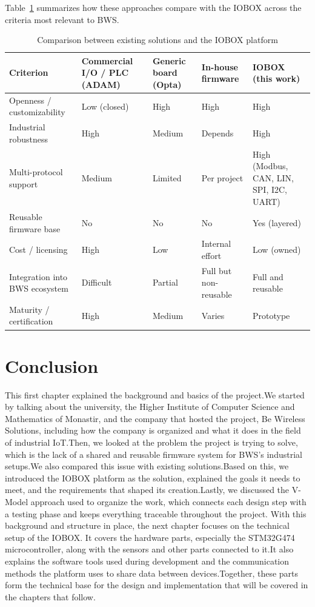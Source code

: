 Table~\ref{tab:comparison} summarizes how these approaches compare with the IOBOX
across the criteria most relevant to BWS.

\begin{table}[H]
\centering
\renewcommand{\arraystretch}{1.4}
\caption{Comparison between existing solutions and the IOBOX platform}
\label{tab:comparison}
\begin{tabular}{|p{3.2cm}|p{2.6cm}|p{2.6cm}|p{2.6cm}|p{2.6cm}|}
\hline
\textbf{Criterion} & \textbf{Commercial I/O / PLC (ADAM)} & \textbf{Generic board (Opta)} & \textbf{In-house firmware} & \textbf{IOBOX (this work)} \\
\hline
Openness / customizability & Low (closed) & High & High & High \\
\hline
Industrial robustness & High & Medium & Depends & High \\
\hline
Multi-protocol support & Medium & Limited & Per project & High (Modbus, CAN, LIN, SPI, I2C, UART) \\
\hline
Reusable firmware base & No & No & No & Yes (layered) \\
\hline
Cost / licensing & High & Low & Internal effort & Low (owned) \\
\hline
Integration into BWS ecosystem & Difficult & Partial & Full but non-reusable & Full and reusable \\
\hline
Maturity / certification & High & Medium & Varies & Prototype \\
\hline
\end{tabular}
\end{table}


\section{Conclusion}

This first chapter explained the background and basics of the project.We started by talking about the university, the Higher Institute of Computer Science and Mathematics of Monastir, and the company that hosted the project, Be Wireless Solutions, including how the company is organized and what it does in the field of industrial IoT.Then, we looked at the problem the project is trying to solve, which is the lack of a shared and reusable firmware system for BWS's industrial setups.We also compared this issue with existing solutions.Based on this, we introduced the IOBOX platform as the solution, explained the goals it needs to meet, and the requirements that shaped its creation.Lastly, we discussed the V-Model approach used to organize the work, which connects each design step with a testing phase and keeps everything traceable throughout the project.
With this background and structure in place, the next chapter focuses on the technical setup of the IOBOX.
It covers the hardware parts, especially the STM32G474 microcontroller, along with the sensors and other parts connected to it.It also explains the software tools used during development and the communication methods the platform uses to share data between devices.Together, these parts form the technical base for the design and implementation that will be covered in the chapters that follow.